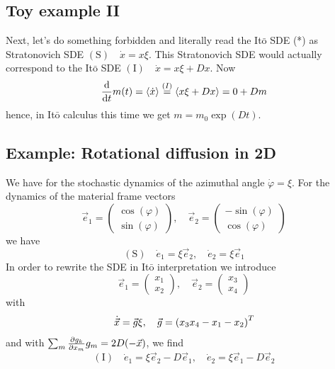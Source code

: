 \documentclass{notebook}
\begin{document}
\subsection*{Toy example II}

Next, let's do something forbidden and literally read the It$\bar{\mathrm{o}}$ SDE (*) as Stratonovich SDE $\mathrm{(S)} \quad \dot{x} = x \xi$. This Stratonovich SDE would actually correspond to the It$\bar{\mathrm{o}}$ SDE $\mathrm{(I)} \quad \dot{x} = x \xi + D x$. Now
%
\begin{equation}
\dv{t} m(t) = \expval{\dot{x}} \overset{(I)}{=} \expval{x \xi + D x} = 0 + D m
\end{equation}
%
hence, in It$\bar{\mathrm{o}}$ calculus this time we get $m = m_0 \exp(Dt)$.

\subsection*{Example: Rotational diffusion in 2D}

We have for the stochastic dynamics of the azimuthal angle $\dot{\varphi} = \xi$. For the dynamics of the material frame vectors
%
\begin{equation*}
\vec{e}_1 = \begin{pmatrix} \cos(\varphi) \\ \sin(\varphi) \end{pmatrix}, \quad 
\vec{e}_2 = \begin{pmatrix} -\sin(\varphi) \\ \cos(\varphi) \end{pmatrix}
\end{equation*}
%
we have 
%
\begin{equation}
\mathrm{(S)} \quad \dot{e}_1 = \xi \vec{e}_2, \quad \dot{e}_2 = \xi \vec{e}_1
\end{equation}
%
In order to rewrite the SDE in It$\bar{\mathrm{o}}$ interpretation we introduce
%
\begin{equation*}
\vec{e}_1 = \begin{pmatrix} x_1 \\ x_2 \end{pmatrix}, \quad 
\vec{e}_2 = \begin{pmatrix} x_3 \\ x_4 \end{pmatrix}
\end{equation*}
%
with
%
\begin{equation*}
\dot{\vec{x}} = \vec{g} \xi, \quad 
\vec{g} = \left(x_3 \\ x_4 \\ -x_1 \\ -x_2 \right)^T
\end{equation*}
%
and with $\sum_m \pdv{g_k}{x_m} g_m = 2 D(-\vec{x})$, we find
%
\begin{equation}
\mathrm{(I)} \quad \dot{e}_1 = \xi \vec{e}_2 - D \vec{e}_1, \quad \dot{e}_2 = \xi \vec{e}_1 - D \vec{e}_2
\end{equation}
%
\end{document}
